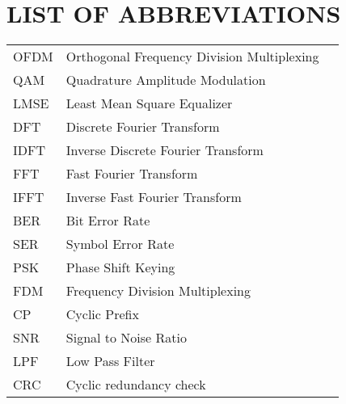 \section*{LIST OF ABBREVIATIONS}
 {}

\begin{tabularx}{0.9\textwidth}{ L{0.4} L{1.3} L{1.3} }
    OFDM    & Orthogonal Frequency Division Multiplexing \\ %
    QAM     & Quadrature Amplitude Modulation \\ %
    LMSE    & Least Mean Square Equalizer \\ %
    DFT     & Discrete Fourier Transform \\
    IDFT    & Inverse Discrete Fourier Transform \\
    FFT     & Fast Fourier Transform \\
    IFFT    & Inverse Fast Fourier Transform \\
    BER     & Bit Error Rate \\ %
    SER     & Symbol Error Rate \\ %
    PSK     & Phase Shift Keying \\ %
    FDM     & Frequency Division Multiplexing \\
    CP      & Cyclic Prefix \\
    SNR     & Signal to Noise Ratio \\ %
    LPF     & Low Pass Filter \\
    CRC     & Cyclic redundancy check \\
\end{tabularx}

\newpage